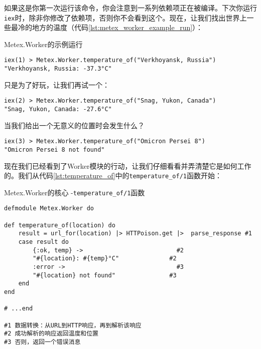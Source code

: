 如果这是你第一次运行该命令，你会注意到一系列依赖项正在被编译。下次你运行\texttt{iex}时，除非你修改了依赖项，否则你不会看到这个。现在，让我们找出世界上一些最冷的地方的温度（代码\ref{lst:metex_worker_example_run}）：

\begin{code}{Metex.Worker的示例运行}
\begin{verbatim}
iex(1) > Metex.Worker.temperature_of("Verkhoyansk, Russia")
"Verkhoyansk, Russia: -37.3°C"
\end{verbatim}
\label{lst:metex_worker_example_run}
\end{code}

只是为了好玩，让我们再试一个：

\begin{code}{}
\begin{verbatim}
iex(2) > Metex.Worker.temperature_of("Snag, Yukon, Canada")
"Snag, Yukon, Canada: -27.6°C"
\end{verbatim}
\end{code}

当我们给出一个无意义的位置时会发生什么？

\begin{code}{}
\begin{verbatim}
iex(3) > Metex.Worker.temperature_of("Omicron Persei 8")
"Omicron Persei 8 not found"
\end{verbatim}
\end{code}

现在我们已经看到了Worker模块的行动，让我们仔细看看并弄清楚它是如何工作的。我们从代码\ref{lst:temperature_of}中的\texttt{temperature\_of/1}函数开始：

\begin{code}{Metex.Worker的核心 -\texttt{temperature\_of/1}函数}
\begin{verbatim}
defmodule Metex.Worker do

def temperature_of(location) do
    result = url_for(location) |> HTTPoison.get |>  parse_response #1
    case result do
        {:ok, temp} ->                          #2
        "#{location}: #{temp}°C"              #2
        :error ->                               #3
        "#{location} not found"               #3
    end
end

# ...end

#1 数据转换：从URL到HTTP响应，再到解析该响应
#2 成功解析的响应返回温度和位置
#3 否则，返回一个错误消息
\end{verbatim}
\label{lst:temperature_of}
\end{code}

